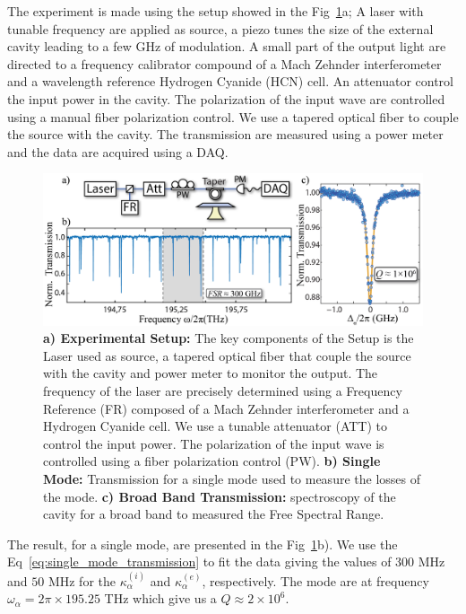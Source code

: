 The experiment is made using the setup showed in the  Fig~\ref{fig:exp_mode_charac}a; A laser with tunable frequency are applied as source, a piezo tunes the size of the external cavity leading to a few GHz of modulation. A small part of the output light are directed to a frequency calibrator compound of a Mach Zehnder interferometer and a wavelength reference Hydrogen Cyanide (HCN) cell. An attenuator control the input power in the cavity. The polarization of the input wave are controlled using a manual fiber polarization control. We use a tapered optical fiber to couple the source with the cavity. The transmission are measured using a power meter and the data are acquired using a DAQ. 
\begin{figure}[h!]
    \centering
    \includegraphics[width = 16cm]{figuras/Dissertation_optical_char_exp.jpg}
    \caption{\textbf{a) Experimental Setup:} The key components of the Setup is the Laser used as source, a tapered optical fiber that couple the source with the cavity and power meter to monitor the output. The frequency of the laser are precisely determined using a Frequency Reference (FR) composed of a Mach Zehnder interferometer and a Hydrogen Cyanide cell. We use a tunable attenuator (ATT) to control the input power. The polarization of the input wave is controlled using a fiber polarization control (PW). \textbf{b) Single Mode:} Transmission for a single mode used to measure the losses of the mode. \textbf{c) Broad Band Transmission:} spectroscopy of the cavity for a broad band to measured the Free Spectral Range.} 
    \label{fig:exp_mode_charac}
\end{figure}

The result, for a single mode, are presented in the Fig~\ref{fig:exp_mode_charac}b). We use the Eq~\ref{eq:single_mode_transmission} to fit the data giving the values of $300$ MHz and $50$ MHz for the $\kappa_\alpha^{(i)}$ and $\kappa_\alpha^{(e)}$, respectively. The mode are at frequency $\omega_\alpha = 2\pi\times195.25$ THz which give us a $Q \approx 2\times10^6$.

